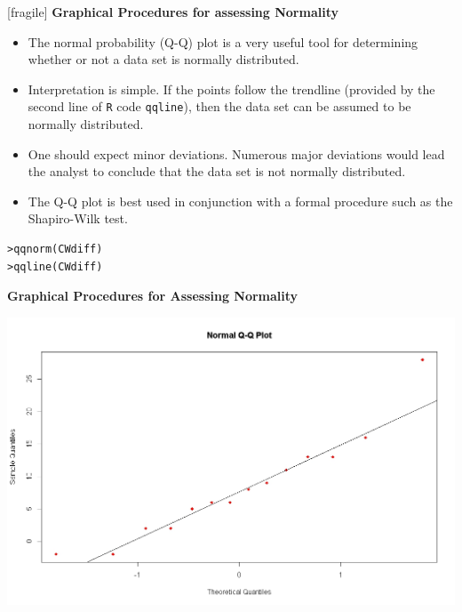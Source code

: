 

[fragile]
\noindent \textbf{Graphical Procedures for assessing Normality}

\begin{itemize}
\item The normal probability (Q-Q) plot is a very useful tool for determining whether or not a data set is normally distributed.
\item Interpretation is simple. If the points follow the trendline (provided by the second line of \texttt{R} code \texttt{qqline}), then the data set can be assumed to be normally distributed.
\item One should expect minor deviations. Numerous major deviations would lead the analyst to conclude that the data set is not normally distributed.
\item The Q-Q plot is best used in conjunction with a formal procedure such as the Shapiro-Wilk test.
\end{itemize}

\begin{verbatim}
>qqnorm(CWdiff)
>qqline(CWdiff)
\end{verbatim}





\noindent \textbf{Graphical Procedures for Assessing Normality}

\begin{center}
\includegraphics[scale=0.32]{10AQQplot}
\end{center}





